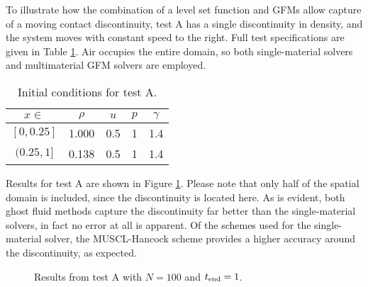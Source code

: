 \documentclass[final,3p,twocolumn]{elsarticle}
\begin{document}
To illustrate how the combination of a level set function and GFMs allow
capture of a moving contact discontinuity, test A has a single discontinuity in
density, and the system moves with constant speed to the right. Full test
specifications are given in Table \ref{tab:testA}. Air occupies the entire
domain, so both single-material solvers and multimaterial GFM solvers are
employed. 

\begin{table}[htb]
    \centering
    \begin{tabular}{ccccc}
        \hline
        $x \in $ & $\rho$ & $u$ & $p$ & $\gamma$ \\
        \hline
        $[0,0.25]$ & 1.000 & 0.5 & 1 & 1.4 \\
        $(0.25,1]$ & 0.138 & 0.5 & 1 & 1.4 \\
        \hline
    \end{tabular}
    \caption{Initial conditions for test A.}
    \label{tab:testA}
\end{table}

Results for test A are shown in Figure \ref{fig:testA}. Please note that only
half of the spatial domain is included, since the discontinuity is located
here. As is evident, both ghost fluid methods capture the discontinuity far
better than the single-material solvers, in fact no error at all is apparent.
Of the schemes used for the single-material solver, the MUSCL-Hancock scheme
provides a higher accuracy around the discontinuity, as expected. 


\begin{figure}[htb]
    \centering
    \caption[caption]
    {
        Results from test A with $N=100$ and $t_{\rm end}=1$. 
    }
    \label{fig:testA}
\end{figure}
\end{document}
